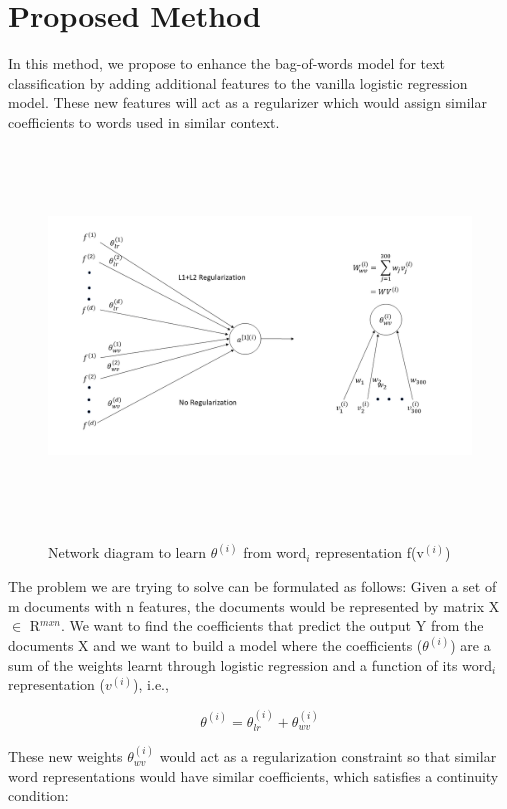 \newpage
\section{Proposed Method}

In this method, we propose to enhance the bag-of-words model for text classification by adding additional features to the vanilla logistic regression model. These new features will act as a regularizer which would assign similar coefficients to words used in similar context.

\begin{figure}[htbp]
\centering
\includegraphics[width=16cm, height=10cm]{images/proposed_method.png}\\
\centering
\caption{Network diagram to learn $\theta^{(i)}$ from word$_{i}$ representation f(v$^{(i)}$)}
\label{fig:foo}
\end{figure}

The problem we are trying to solve can be formulated as follows: Given a set of m documents with n features, the documents would be represented by matrix X $\in$ R$^{m x n}$. We want to find the coefficients that predict the output Y from the documents X and we want to build a model where the coefficients ($\theta^{(i)}$) are a sum of the weights learnt through logistic regression and a function of its word$_{i}$ representation ($v^{(i)}$), i.e.,

\begin{equation}\label{lb1}
\theta^{(i)} = \theta_{lr}^{(i)} + \theta_{wv}^{(i)}
\end{equation}

These new weights $\theta_{wv}^{(i)}$ would act as a regularization constraint so that similar word representations would have similar coefficients, which satisfies a continuity condition:

